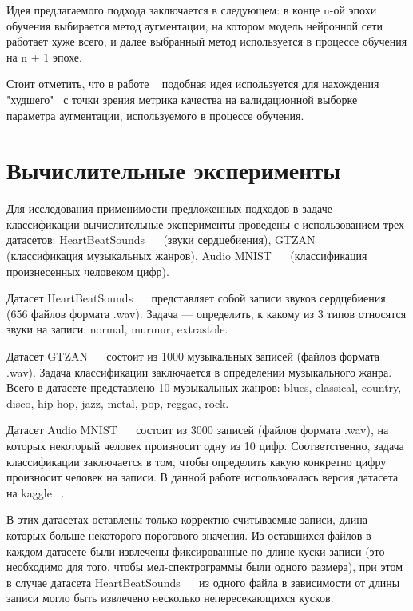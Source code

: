 \documentclass[12pt, fleqn]{article}
\begin{document}
Идея предлагаемого подхода заключается в следующем: в конце n-ой эпохи обучения выбирается метод аугментации, на котором модель нейронной сети работает хуже всего, и далее выбранный метод используется в процессе обучения на n + 1 эпохе.

Стоит отметить, что в работе ~\cite{NearestAlgorithm} подобная идея используется для нахождения "худшего" \ с точки зрения метрика качества на валидационной выборке параметра аугментации, используемого в процессе обучения. 

\newpage
\section{Вычислительные эксперименты}
	
Для исследования применимости предложенных подходов в задаче классификации вычислительные эксперименты проведены с использованием трех датасетов: HeartBeatSounds ~\cite{HeartbeatSoundsArticle}~\cite{HeartbeatSoundsKaggle} (звуки сердцебиения), GTZAN ~\cite{GTZAN_Article}~\cite{GTZAN_kaggle} (классификация музыкальных жанров), Audio MNIST ~\cite{AudioMnistArticle}~\cite{AudioMnistKaggle} (классификация произнесенных человеком цифр).
	
Датасет HeartBeatSounds ~\cite{HeartbeatSoundsArticle}~\cite{HeartbeatSoundsKaggle} представляет собой записи звуков сердцебиения (656 файлов формата .wav). Задача --- определить, к какому из 3 типов относятся звуки на записи: normal, murmur, extrastole.  
	
Датасет GTZAN ~\cite{GTZAN_Article}~\cite{GTZAN_kaggle} состоит из 1000 музыкальных записей (файлов формата .wav). Задача классификации заключается в определении музыкального жанра. Всего в датасете представлено 10 музыкальных жанров: blues, classical, country, disco, hip hop, jazz, metal, pop, reggae, rock.

Датасет Audio MNIST ~\cite{AudioMnistArticle}~\cite{AudioMnistKaggle} состоит из 3000 записей (файлов формата .wav), на которых некоторый человек произносит одну из 10 цифр. Соответственно, задача классификации заключается в том, чтобы определить какую конкретно цифру произносит человек на записи. В данной работе использовалась версия датасета на kaggle ~\cite{AudioMnistKaggle}.

	
В этих датасетах оставлены только корректно считываемые записи, длина которых больше некоторого порогового значения. Из оставшихся файлов в каждом датасете были извлечены фиксированные по длине куски записи (это необходимо для того, чтобы мел-спектрограммы были одного размера), при этом в случае датасета HeartBeatSounds ~\cite{HeartbeatSoundsArticle}~\cite{HeartbeatSoundsKaggle} из одного файла в зависимости от длины записи могло быть извлечено несколько непересекающихся кусков.
\end{document}
